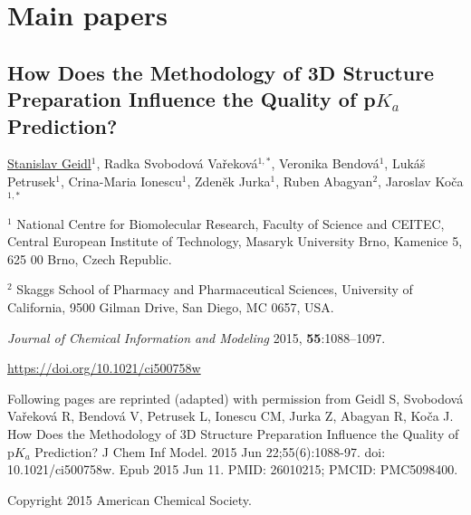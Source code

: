 \chapter{Main papers}
\label{chapter:papers}

\clearpage

\begin{center}
\section{\centering How Does the Methodology of 3D Structure
Preparation Influence the Quality of p$K_a$ Prediction?}
    
\underline{Stanislav Geidl$^1$}, Radka Svobodová Vařeková$^{1, *}$,
Veronika Bendová$^1$, Lukáš Petrusek$^1$, Crina-Maria Ionescu$^1$,
Zdeněk Jurka$^1$, Ruben Abagyan$^2$, Jaroslav Koča$^{1, *}$

\vspace{1cm}

$^1$ National Centre for Biomolecular Research, Faculty of Science and CEITEC,
Central European Institute of Technology, Masaryk University Brno, Kamenice 5,
625 00 Brno, Czech Republic.

$^2$ Skaggs School of Pharmacy and Pharmaceutical Sciences, University of
California, 9500 Gilman Drive, San Diego, MC 0657, USA.

\vspace{1cm}

\textit{Journal of Chemical Information and  Modeling} 2015, \textbf{55}:1088–1097.

\vspace{1cm}

\url{https://doi.org/10.1021/ci500758w}

\vspace{1cm}

Following pages are reprinted (adapted) with permission from 
Geidl S, Svobodová Vařeková R, Bendová V, Petrusek L, Ionescu CM,
Jurka Z, Abagyan R, Koča J. How Does the Methodology of 3D Structure
Preparation Influence the Quality of p$K_a$ Prediction? J Chem Inf Model.
2015 Jun 22;55(6):1088-97. doi: 10.1021/ci500758w. Epub 2015 Jun 11.
PMID: 26010215; PMCID: PMC5098400.

Copyright 2015 American Chemical Society.

\end{center}





